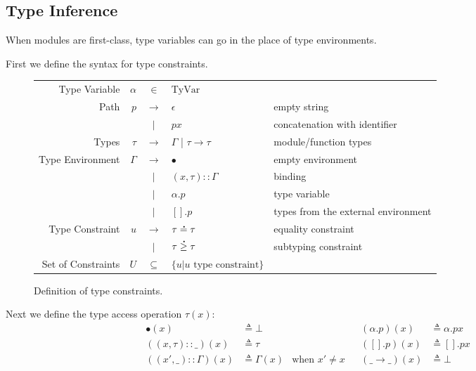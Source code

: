 \documentclass{article}
\theoremstyle{definition}
\newcommand*{\vbar}{|}
\newcommand*{\cons}{::}
\newcommand*{\A}[1]{\overset{\,_{\mbox{\Large .}}}{#1}}
\newcommand*{\TyVar}{\text{TyVar}}
\begin{document}
\subsection{Type Inference}

When modules are first-class, type variables can go in the place of type environments.

First we define the syntax for type constraints.
\begin{figure}[h!]
  \centering
  \begin{tabular}{rrcll}
    Type Variable      & $\alpha$ & $\in$         & $\TyVar$                                                               \\
    Path               & $p$      & $\rightarrow$ & $\epsilon$                       & empty string                        \\
                       &          & $\vbar$       & $p x$                            & concatenation with identifier       \\
    Types              & $\tau$   & $\rightarrow$ & $\Gamma$ | $\tau\rightarrow\tau$ & module/function types               \\
    Type Environment   & $\Gamma$ & $\rightarrow$ & $\bullet$                        & empty environment                   \\
                       &          & $\vbar$       & $(x,\tau)\cons \Gamma$           & binding                             \\
                       &          & $\vbar$       & $\alpha.p$                       & type variable                       \\
                       &          & $\vbar$       & $[].p$                           & types from the external environment \\
    Type Constraint    & $u$      & $\rightarrow$ & $\tau\A{=}\tau$                  & equality constraint                 \\
                       &          & $\vbar$       & $\tau\A{\ge}\tau$                & subtyping constraint                \\
    Set of Constraints & $U$      & $\subseteq$   & $\{u|u\text{ type constraint}\}$
  \end{tabular}
  \caption{Definition of type constraints.}
  \label{fig:typeqdom}
\end{figure}

Next we define the type access operation $\tau(x)$:
\begin{align*}
  \bullet(x)              & \triangleq\bot      &                      &  & (\alpha.p)(x)        & \triangleq\alpha.px \\
  ((x,\tau)\cons\_)(x)    & \triangleq\tau      &                      &  & ([].p)(x)            & \triangleq[].px     \\
  ((x',\_)\cons\Gamma)(x) & \triangleq\Gamma(x) & \text{when }x'\neq x &  & (\_\rightarrow\_)(x) & \triangleq\bot
\end{align*}
\end{document}
